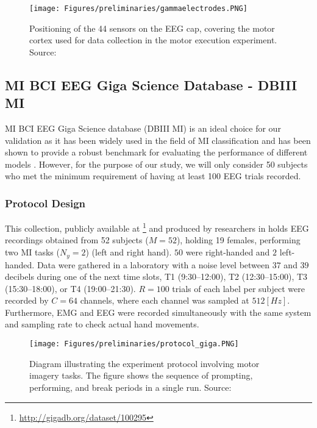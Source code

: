 \begin{figure}[h!]
\centering
    \texttt{[image: Figures/preliminaries/gammaelectrodes.PNG]}
    \caption{Positioning of the 44 sensors on the EEG cap, covering the motor cortex used for data collection in the motor execution experiment. Source: \cite{borra2019eeg} \label{fig:eeg_gamma}}
\end{figure}

\subsection{MI BCI EEG Giga Science Database - DBIII MI}

MI BCI EEG Giga Science database (DBIII MI) is an ideal choice for our validation as it has been widely used in the field of MI classification and has been shown to provide a robust benchmark for evaluating the performance of different models \cite{cho2017eeg}.
However, for the purpose of our study, we will only consider 50 subjects who met the minimum requirement of having at least 100 EEG trials recorded.

\subsubsection{Protocol Design}

This collection, publicly available at \footnote{\url{http://gigadb.org/dataset/100295}} and produced by researchers in \cite{cho2017eeg} holds EEG recordings obtained from 52 subjects ($M=52$), holding 19 females, performing two MI tasks ($N_y=2$) (left and right hand). $50$ were right-handed and $2$ left-handed. Data were gathered in a laboratory with a noise level between $37$ and $39$ decibels during one of the next time slots, T1 (9:30–12:00), T2 (12:30–15:00), T3 (15:30–18:00), or T4 (19:00–21:30).  $R=100$ trials of each label per subject were recorded by $C=64$ channels, where each channel was sampled at $512 [Hz]$. Furthermore, EMG and EEG were recorded simultaneously with the same system and sampling rate to check actual hand movements.

\begin{figure}[h!]
\centering
    \texttt{[image: Figures/preliminaries/protocol\_giga.PNG]}
    \caption{Diagram illustrating the experiment protocol involving motor imagery tasks. The figure shows the sequence of prompting, performing, and break periods in a single run. Source: \cite{cho2017eeg} \label{fig:protocol_giga}}
\end{figure}

